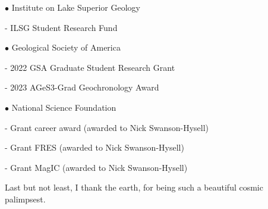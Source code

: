 \documentclass{ucbthesis}
\begin{document}
\begin{frontmatter}
\begin{acknowledgements}
$\bullet$ Institute on Lake Superior Geology
    \vspace{5mm}
    
    \hspace{\parindent} - ILSG Student Research Fund
    \vspace{5mm}
    
$\bullet$ Geological Society of America
    \vspace{5mm}
    
    \hspace{\parindent} - 2022 GSA Graduate Student Research Grant 
    \vspace{5mm}
    
    \hspace{\parindent} - 2023 AGeS3-Grad Geochronology Award
    \vspace{5mm}
    
$\bullet$ National Science Foundation
    \vspace{5mm}

    \hspace{\parindent} - Grant career award  (awarded to Nick Swanson-Hysell)
    \vspace{5mm}
    
    \hspace{\parindent} - Grant FRES  (awarded to Nick Swanson-Hysell)
    \vspace{5mm}
    
    \hspace{\parindent} - Grant MagIC  (awarded to Nick Swanson-Hysell)
    \vspace{15mm}
    
Last but not least, I thank the earth, for being such a beautiful cosmic palimpsest. 

\end{acknowledgements}

\end{frontmatter}

\pagestyle{headings}












\appendix




\end{document}
